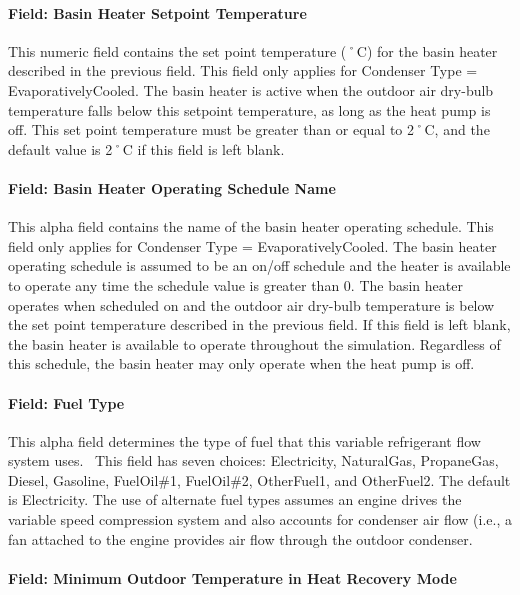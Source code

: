 \paragraph{Field: Basin Heater Setpoint Temperature}\label{field-basin-heater-setpoint-temperature-004}

This numeric field contains the set point temperature (˚C) for the basin heater described in the previous field. This field only applies for Condenser Type = EvaporativelyCooled. The basin heater is active when the outdoor air dry-bulb temperature falls below this setpoint temperature, as long as the heat pump is off. This set point temperature must be greater than or equal to 2˚C, and the default value is 2˚C if this field is left blank.

\paragraph{Field: Basin Heater Operating Schedule Name}\label{field-basin-heater-operating-schedule-name-003}

This alpha field contains the name of the basin heater operating schedule. This field only applies for Condenser Type = EvaporativelyCooled. The basin heater operating schedule is assumed to be an on/off schedule and the heater is available to operate any time the schedule value is greater than 0. The basin heater operates when scheduled on and the outdoor air dry-bulb temperature is below the set point temperature described in the previous field. If this field is left blank, the basin heater is available to operate throughout the simulation. Regardless of this schedule, the basin heater may only operate when the heat pump is off.

\paragraph{Field: Fuel Type}\label{field-fuel-type-005}

This alpha field determines the type of fuel that this variable refrigerant flow system uses.~ This field has seven choices: Electricity, NaturalGas, PropaneGas, Diesel, Gasoline, FuelOil\#1, FuelOil\#2, OtherFuel1, and OtherFuel2. The default is Electricity. The use of alternate fuel types assumes an engine drives the variable speed compression system and also accounts for condenser air flow (i.e., a fan attached to the engine provides air flow through the outdoor condenser.

\paragraph{Field: Minimum Outdoor Temperature in Heat Recovery Mode}\label{field-minimum-outdoor-temperature-in-heat-recovery-mode-000}

